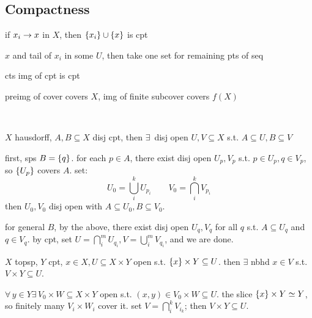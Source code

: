 \subsection{Compactness}

\begin{prop}
    if $x_{i} \rightarrow x$ in $X$, then $\left\{{x_{i}}\right\}\cup\left\{{x}\right\}$ is cpt
\end{prop}

\begin{pf}[source=Primary Source Material]
    $x$ and tail of $x_{i}$ in some $U$,
    then take one set for remaining pts of seq
\end{pf}

\begin{prop}[type=Theorem]
    cts img of cpt is cpt
\end{prop}

\begin{pf}[source=Primary Source Material]
    preimg of cover covers $X$, img of finite subcover covers $f(X)$
\end{pf} \

\begin{lm}
    $X$ hausdorff, $A,B\subseteq X$ disj cpt, then
    $\exists \, $ disj open $U,V\subseteq X$ s.t. $A\subseteq U,B\subseteq V$
\end{lm}

\begin{pf}[source=Primary Source Material]
    first, sps $B=\left\{{q}\right\}$.
    for each $p\in A$, there exist disj open $U_{p},V_{p}$ s.t.
    $p\in U_{p},q\in V_{p}$, so $\left\{{U_{p}}\right\}$ covers $A$.
    set:
    \begin{equation*}
        U_{0}=\bigcup_{i}^{k}U_{p_{i}} \qquad
        V_{0}=\bigcap_{i}^{k}V_{p_{i}}
    \end{equation*}
    then $U_{0},V_{0}$ disj open with $A\subseteq U_{0},B\subseteq V_{0}$.

    for general $B$, by the above, there exist disj open $U_{q},V_{q}$
    for all $q$ s.t. $A\subseteq U_{q}$ and $q\in V_{q}$.
    by cpt, set $U=\bigcap_{i}^{m}U_{q_{i}},V=\bigcup_{i}^{m}V_{q_{i}}$,
    and we are done.
\end{pf}

\begin{lm}[title=Tube Lemma]
    $X$ topsp, $Y$ cpt, $x\in X, U\subseteq X\times Y$ open s.t.
    $\left\{{x}\right\}\times Y\subseteq U$.
    then $\exists$ nbhd $x\in V$ s.t. $V\times Y\subseteq U$.
\end{lm}

\begin{pf}[source=Primary Source Material]
    $\forall \, y\in Y \exists \, V_{0}\times W\subseteq X\times Y$ open s.t.
    $(x,y)\in V_{0}\times W\subseteq U$.
    the slice $\left\{{x}\right\}\times Y\simeq Y$, so finitely many $V_{i}\times W_{i}$
    cover it.
    set $V=\bigcap_{i}^{k}V_{i_{k}}$; then $V\times Y\subseteq U$.
\end{pf}


